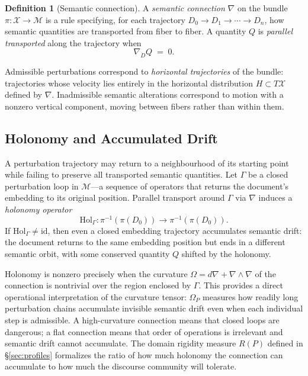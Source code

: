 \documentclass[12pt, a4paper]{article}
\theoremstyle{plain}
\theoremstyle{definition}
\newtheorem{definition}[theorem]{Definition}
\theoremstyle{remark}
\newcommand{\calX}{\mathcal{X}}
\newcommand{\calM}{\mathcal{M}}
\newcommand{\vpi}{\pi}
\newcommand{\fiber}[1]{\vpi^{-1}(#1)}
\newcommand{\connD}{\nabla}
\newcommand{\curv}{\Omega}
\begin{document}
\begin{definition}[Semantic connection]
\label{def:connection}
A \emph{semantic connection} $\connD$ on the bundle $\vpi : \calX \to \calM$
is a rule specifying, for each trajectory $D_0 \to D_1 \to \cdots \to D_n$,
how semantic quantities are transported from fiber to fiber.  A quantity $Q$
is \emph{parallel transported} along the trajectory when
\[
   \connD_{\dot D} Q \;=\; 0.
\]
\end{definition}

Admissible perturbations correspond to \emph{horizontal trajectories} of the
bundle: trajectories whose velocity lies entirely in the horizontal distribution
$H \subset T\calX$ defined by $\connD$.  Inadmissible semantic alterations
correspond to motion with a nonzero vertical component, moving between fibers
rather than within them.

\subsection{Holonomy and Accumulated Drift}

A perturbation trajectory may return to a neighbourhood of its starting point
while failing to preserve all transported semantic quantities.  Let $\Gamma$
be a closed perturbation loop in $\calM$---a sequence of operators that returns
the document's embedding to its original position.  Parallel transport around
$\Gamma$ via $\connD$ induces a \emph{holonomy operator}
\[
   \mathrm{Hol}_{\Gamma} : \fiber{\vpi(D_0)} \to \fiber{\vpi(D_0)}.
\]
If $\mathrm{Hol}_{\Gamma} \neq \mathrm{id}$, then even a closed embedding
trajectory accumulates semantic drift: the document returns to the same
embedding position but ends in a different semantic orbit, with some conserved
quantity $Q$ shifted by the holonomy.

Holonomy is nonzero precisely when the curvature $\curv = d\connD + \connD
\wedge \connD$ of the connection is nontrivial over the region enclosed by
$\Gamma$.  This provides a direct operational interpretation of the curvature
tensor: $\curv_P$ measures how readily long perturbation chains accumulate
invisible semantic drift even when each individual step is admissible.  A
high-curvature connection means that closed loops are dangerous; a flat
connection means that order of operations is irrelevant and semantic drift
cannot accumulate.  The domain rigidity measure $R(P)$ defined in
\S\ref{sec:profiles} formalizes the ratio of how much holonomy the connection
can accumulate to how much the discourse community will tolerate.
\end{document}
